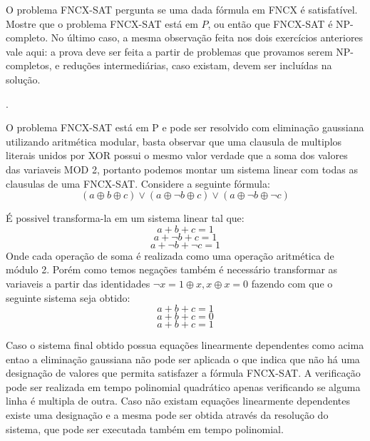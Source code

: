 \documentclass[12pt]{article}
\newcommand{\resposta}[1]{ \noindent {\bf Solução}.{\color{blue} #1}}
\begin{document}
\begin{enumerate}
  O problema FNCX-SAT pergunta se uma dada fórmula em FNCX é
  satisfatível. Mostre que o problema FNCX-SAT está em $P$, ou então
  que FNCX-SAT é NP-completo. No último caso, a mesma observação feita
  nos dois exercícios anteriores vale aqui: a prova deve ser feita a
  partir de problemas que provamos serem NP-completos, e reduções
  intermediárias, caso existam, devem ser incluídas na solução.

  \resposta{
     O problema FNCX-SAT está em P e pode ser resolvido com eliminação gaussiana utilizando aritmética modular, basta observar que uma clausula de multiplos literais unidos por XOR possui o mesmo valor verdade que a soma dos valores das variaveis MOD 2, portanto podemos montar um sistema linear com todas as clausulas de uma FNCX-SAT.
    Considere a seguinte fórmula:
        \[ (a \oplus b \oplus c) \lor
        (a \oplus \neg b \oplus c) \lor
        (a \oplus \neg b \oplus \neg c) \]
    
    É possivel transforma-la em um sistema linear tal que:
        \[ a + b + c = 1\]
        \[ a + \neg b + c = 1\]
        \[ a + \neg b + \neg c = 1\]
    Onde cada operação de soma é realizada como uma operação aritmética de módulo 2. Porém como temos negações também é necessário transformar as variaveis a partir das identidades \(\neg x = 1 \oplus x , x \oplus x = 0 \) fazendo com que o seguinte sistema seja obtido:
        \[ a + b + c = 1\]
        \[ a + b + c = 0\]
        \[ a + b + c = 1\]
    
    Caso o sistema final obtido possua equações linearmente dependentes como acima entao a eliminação gaussiana não pode ser aplicada o que indica que não há uma designação de valores que permita satisfazer a fórmula FNCX-SAT. A verificação pode ser realizada em tempo polinomial quadrático apenas verificando se alguma linha é multipla de outra. Caso não existam equações linearmente dependentes existe uma designação e a mesma pode ser obtida através da resolução do sistema, que pode ser executada também em tempo polinomial. 
  }
\end{enumerate}
\end{document}
